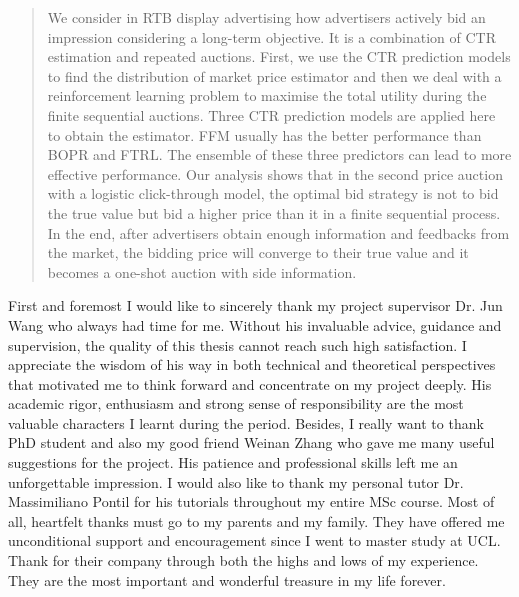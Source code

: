 \maketitle
\makedeclaration

\begin{abstract} %
We consider in RTB display advertising how advertisers actively bid an impression considering a long-term objective. It is a combination of CTR estimation and repeated auctions. First, we use the CTR prediction models to find the distribution of market price estimator and then we deal with a reinforcement learning problem to maximise the total utility during the finite sequential auctions. Three CTR prediction models are applied here to obtain the estimator. FFM usually has the better performance than BOPR and FTRL. The ensemble of these three predictors can lead to more effective performance. Our analysis shows that in the second price auction with a logistic click-through model, the optimal bid strategy is not to bid the true value but bid a higher price than it in a finite sequential process. In the end, after advertisers obtain enough information and feedbacks from the market, the bidding price will converge to their true value and it becomes a one-shot auction with side information.
\end{abstract}

\begin{acknowledgements}
First and foremost I would like to sincerely thank my project supervisor Dr. Jun Wang who always had time for me. Without his invaluable advice, guidance and supervision, the quality of this thesis cannot reach such high satisfaction. I appreciate the wisdom of his way in both technical and theoretical perspectives that motivated me to think forward and concentrate on my project deeply. His academic rigor, enthusiasm and strong sense of responsibility are the most valuable characters I learnt during the period. Besides, I really want to thank PhD student and also my good friend Weinan Zhang who gave me many useful suggestions for the project. His patience and professional skills left me an unforgettable impression. I would also like to thank my personal tutor Dr. Massimiliano Pontil for his tutorials throughout my entire MSc course. Most of all, heartfelt thanks must go to my parents and my family. They have offered me unconditional support and encouragement since I went to master study at UCL. Thank for their company through both the highs and lows of my experience. They are the most important and wonderful treasure in my life forever.
\end{acknowledgements}

\setcounter{tocdepth}{2} 

\tableofcontents
\listoffigures
\listoftables

